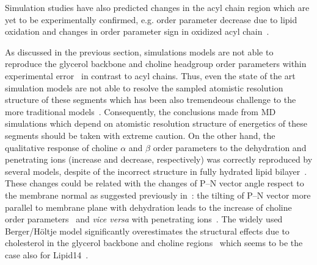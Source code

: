 \documentclass[aps,prl,superscriptaddress,twocolumn]{revtex4}
\begin{document}
Simulation studies have also predicted changes in the acyl chain region which are yet to be experimentally 
confirmed, e.g. order parameter decrease due to lipid oxidation and changes in order parameter sign in oxidized 
acyl chain~\cite{ekkabut07}. %


As discussed in the previous section, simulations models are not able to reproduce the glycerol backbone 
and choline headgroup order parameters within experimental error~\cite{botan15} in contrast to acyl chains.
Thus, even the state of the art simulation models are not able to resolve the sampled atomistic resolution
structure of these segments which has been also tremendeous challenge to the more traditional models~\cite{gally75,seelig77,strenk85,akutsu91,bruzik97,Semchyschyn04}.
Consequently, the conclusions made from MD simulations which depend on atomistic resolution structure
of energetics of these segments should be taken with extreme caution.
On the other hand, the qualitative response of choline $\alpha$ and $\beta$ order parameters to the dehydration 
and penetrating ions (increase and decrease, respectively) was correctly reproduced by several models, 
despite of the incorrect structure in fully hydrated lipid bilayer~\cite{botan15,ionpaper}.
These changes could be related with the changes of P--N vector angle respect to the membrane normal as 
suggested previously in~\cite{scherer89}: the tilting of P--N vector more parallel to membrane plane with
dehydration leads to the increase of choline order parameters~\cite{botan15} and {\it vice versa} with penetrating ions~\cite{ionpaper}.
The widely used Berger/Höltje model significantly overestimates the structural effects due to cholesterol 
in the glycerol backbone and choline regions~\cite{ferreira13,botan15} which seems to be the 
case also for Lipid14~\cite{madej15}.
\end{document}
